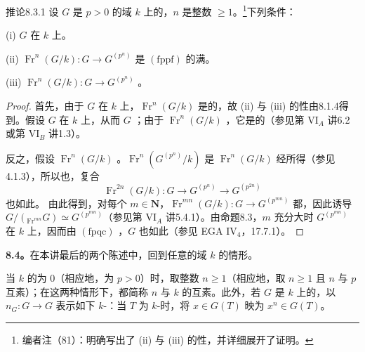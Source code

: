 \begin{SGAresult}{推论}{8.3.1}
设 $G$ 是 $p>0$ 的域 $k$ 上的，\footnotemark[\value{footnote}]$n$ 是整数 $\ge1$。\footnote{编者注（81）：明确写出了 (ii) 与 (iii) 的性，并详细展开了证明。}下列条件：

(i) $G$ 在 $k$ 上。

(ii) $\operatorname{Fr}^n(G/k):G\to G^{(p^n)}$ 是 $(\mathrm{fppf})$ 的满。

(iii) $\operatorname{Fr}^n(G/k):G\to G^{(p^n)}$ 。
\end{SGAresult}
\begin{proof}
首先，由于 $G$ 在 $k$ 上，$\operatorname{Fr}^n(G/k)$ 是的，故 (ii) 与 (iii) 的性由8.1.4得到。假设 $G$ 在 $k$ 上，从而 $G$ ；由于 $\operatorname{Fr}^n(G/k)$ ，它是的（参见第 VI$_A$ 讲6.2或第 VI$_B$ 讲1.3）。

反之，假设 $\operatorname{Fr}^n(G/k)$ 。$\operatorname{Fr}^n(G^{(p^n)}/k)$ 是 $\operatorname{Fr}^n(G/k)$ 经所得（参见4.1.3），所以也，复合
\[
 \operatorname{Fr}^{2n}(G/k):G\longrightarrow G^{(p^n)}\longrightarrow G^{(p^{2n})}
\]
也如此。
由此得到，对每个 $m\in\mathbf N$，$\operatorname{Fr}^{mn}(G/k):G\to G^{(p^{mn})}$ 都，因此诱导 $G/({}_{\operatorname{Fr}^{mn}}G)\simeq G^{(p^{mn})}$（参见第 VI$_A$ 讲5.4.1）。由命题8.3，$m$ 充分大时 $G^{(p^{mn})}$ 在 $k$ 上，因而由 $(\mathrm{fpqc})$ ，$G$ 也如此（参见 EGA IV$_4$，17.7.1）。
\end{proof}
\textbf{8.4。}在本讲最后的两个陈述中，回到任意的域 $k$ 的情形。

当 $k$ 的为 $0$（相应地，为 $p>0$）时，取整数 $n\ge1$（相应地，取 $n\ge1$ 且 $n$ 与 $p$ 互素）；在这两种情形下，都简称 $n$ 与 $k$ 的互素。此外，若 $G$ 是 $k$ 上的，以 $n_G:G\to G$ 表示如下 $k$-：当 $T$ 为 $k$-时，将 $x\in G(T)$ 映为 $x^n\in G(T)$。

